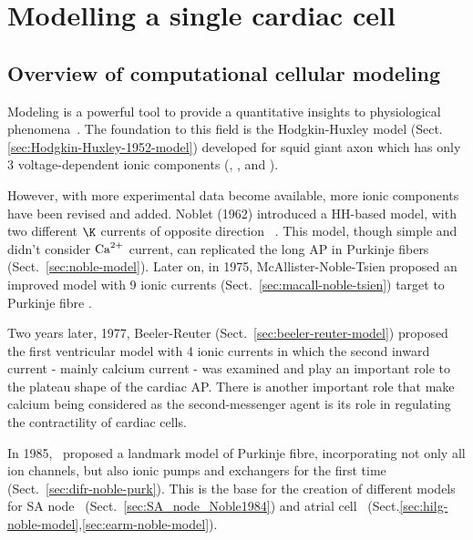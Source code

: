 \chapter{Modelling a single cardiac cell}

\def\ti{{\text{ti}}}
\def\Li{{\ce{Li^+}}}

\section{Overview of computational cellular modeling}
\label{sec:overv-comp-cell}


Modeling is a powerful tool to provide a quantitative insights to physiological
phenomena~\citep{fall2002,keener2008, winslow2011}.  The foundation to this
field is the Hodgkin-Huxley model (Sect.\ref{sec:Hodgkin-Huxley-1952-model})
developed for squid giant axon which has only 3 voltage-dependent
ionic components (, , and ).


However, with more experimental data become available, more ionic components
have been revised and added.
Noblet (1962) introduced a HH-based model, with two different $\K$ currents of
opposite direction ~\citep{noble1962mhh}. This model, though simple and didn't
consider ${\text{Ca}^{2+}}$ current, can replicated the long AP in Purkinje fibers
(Sect.~\ref{sec:noble-model}).  Later on, in 1975, McAllister-Noble-Tsien
proposed an improved model with 9 ionic currents
(Sect.~\ref{sec:macall-noble-tsien}) target to Purkinje fibre
\citep{mcallister1975rea}.

Two years later, 1977, Beeler-Reuter (Sect.~\ref{sec:beeler-reuter-model})
proposed the first ventricular model with 4 ionic currents in which the second
inward current - mainly calcium current - was examined and play an important
role to the plateau shape of the cardiac AP. There is another important role
that make calcium being considered as the second-messenger agent is its role in
regulating the contractility of cardiac cells.

In 1985,~\citep{difrancesco1985mcea} proposed a landmark model of
Purkinje fibre, incorporating not only all ion channels, but also
ionic pumps and exchangers for the first time
(Sect.~\ref{sec:difr-noble-purk}). This is the base for the creation
of different models for SA node~\citep{noble1984msa}
(Sect.~\ref{sec:SA_node_Noble1984}) and atrial
cell~\citep{hilgemann1987,earm1990msa}
(Sect.\ref{sec:hilg-noble-model},\ref{sec:earm-noble-model}).

